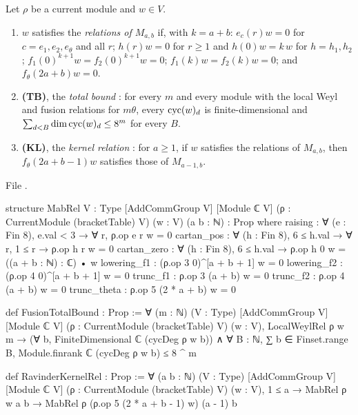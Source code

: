 \begin{definition}\label{l26:def:mab}
Let $\rho$ be a current module and $w\in V$.
\begin{enumerate}
\item[(a)] $w$ satisfies the \emph{relations of $M_{a,b}$} if, with $k=a+b$:
$e_c(r)w=0$ for $c=e_1,e_2,e_\theta$ and all $r$; $h(r)w=0$ for $r\ge1$ and $h(0)w=k\,w$ for $h=h_1,h_2$;
$f_1(0)^{k+1}w=f_2(0)^{k+1}w=0$; $f_1(k)w=f_2(k)w=0$; and $f_\theta(2a+b)w=0$.
\item[(b)] \textbf{(TB)}, the \emph{total bound} : for every $m$ and every module with the local Weyl and
fusion relations for $m\theta$, every $\operatorname{cyc}(w)_d$ is finite-dimensional and $\sum_{d<B}\dim\operatorname{cyc}(w)_d\le8^m$
for every $B$.
\item[(c)] \textbf{(KL)}, the \emph{kernel relation} : for $a\ge1$, if $w$ satisfies the
relations of $M_{a,b}$, then $f_\theta(2a+b-1)w$ satisfies those of $M_{a-1,b}$.
\end{enumerate}
\end{definition}
\noindent File .
\begin{leancode}
structure MabRel {V : Type} [AddCommGroup V] [Module ℂ V]
    (ρ : CurrentModule (bracketTable) V) (w : V) (a b : ℕ) : Prop where
  raising : ∀ (e : Fin 8), e.val < 3 → ∀ r, ρ.op e r w = 0
  cartan_pos : ∀ (h : Fin 8), 6 ≤ h.val → ∀ r, 1 ≤ r → ρ.op h r w = 0
  cartan_zero : ∀ (h : Fin 8), 6 ≤ h.val → ρ.op h 0 w = ((a + b : ℕ) : ℂ) • w
  lowering_f1 : (ρ.op 3 0)^[a + b + 1] w = 0
  lowering_f2 : (ρ.op 4 0)^[a + b + 1] w = 0
  trunc_f1 : ρ.op 3 (a + b) w = 0
  trunc_f2 : ρ.op 4 (a + b) w = 0
  trunc_theta : ρ.op 5 (2 * a + b) w = 0

def FusionTotalBound : Prop :=
  ∀ (m : ℕ) (V : Type) [AddCommGroup V] [Module ℂ V] (ρ : CurrentModule (bracketTable) V) (w : V),
    LocalWeylRel ρ w m → (∀ b, FiniteDimensional ℂ (cycDeg ρ w b)) ∧
      ∀ B : ℕ, ∑ b ∈ Finset.range B, Module.finrank ℂ (cycDeg ρ w b) ≤ 8 ^ m

def RavinderKernelRel : Prop :=
  ∀ (a b : ℕ) (V : Type) [AddCommGroup V] [Module ℂ V] (ρ : CurrentModule (bracketTable) V) (w : V),
    1 ≤ a → MabRel ρ w a b → MabRel ρ (ρ.op 5 (2 * a + b - 1) w) (a - 1) b
\end{leancode}

